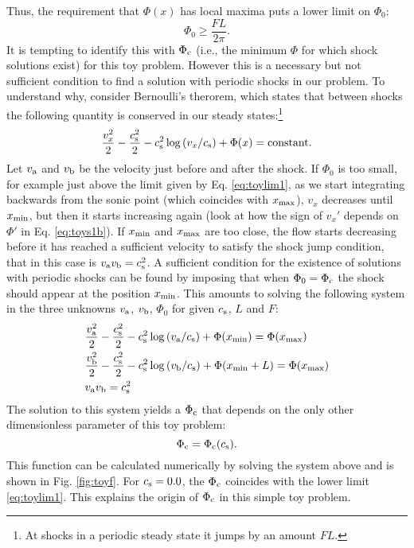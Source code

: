 \documentclass[useAMS,usenatbib]{mn2e}
\begin{document}
Thus, the requirement that $\Phi(x)$ has local maxima puts a lower limit on $\Phi_0$:
\begin{equation}
\Phi_0 \geq \frac{F L } {2 \pi}. \label{eq:toylim1}
\end{equation}
It is tempting to identify this with $\Phi_{\rm c}$ (i.e., the minimum $\Phi$ for which shock solutions exist) for this toy problem. However this is a necessary but not sufficient condition to find a solution with periodic shocks in our problem. To understand why, consider Bernoulli's therorem, which states that between shocks the following quantity is conserved in our steady states:\footnote{At shocks in a periodic steady state it jumps by an amount $FL$.}
\begin{equation}
 \frac{v_x^2}{2} - \frac{c_{\rm s}^2}{2} - c_{\rm s}^2 \log\left(v_x/c_{\rm s}\right) + \Phi(x) = \rm{constant}.
\end{equation}
%
Let $v_{\rm a}$ and $v_{\rm b}$ be the velocity just before and after the shock. If $\Phi_0$ is too small, for example just above the limit given by Eq. \eqref{eq:toylim1}, as we start integrating backwards from the sonic point (which coincides with $x_{\rm max}$), $v_x$ decreases until $x_{\rm min}$, but then it starts increasing again (look at how the sign of $v_x'$ depends on $\Phi'$ in Eq. \ref{eq:toys1b}). If $x_{\rm min}$ and $x_{\rm max}$ are too close, the flow starts decreasing before it has reached a sufficient velocity to satisfy the shock jump condition, that in this case is $v_{\rm a} v_{\rm b} = c_{\rm s}^2$. A sufficient condition for the existence of solutions with periodic shocks can be found by imposing that when $\Phi_0=\Phi_{\rm c}$ the shock should appear at the position $x_{\rm min}$. This amounts to solving the following system in the three unknowns $v_{\rm a}$, $v_{\rm b}$, $\Phi_0$ for given $c_{\rm s}$, $L$ and $F$:
\begin{align} 
	& \frac{v_{\rm a}^2}{2} - \frac{c_{\rm s}^2}{2} - c_{\rm s}^2 \log\left(v_{\rm a}/c_{\rm s}\right) + \Phi(x_{\rm min}) = \Phi(x_{\rm max}) \\ 
	&  \frac{v_{\rm b}^2}{2} - \frac{c_{\rm s}^2}{2} - c_{\rm s}^2 \log\left(v_{\rm b}/c_{\rm s}\right) + \Phi(x_{\rm min} + L) = \Phi(x_{\rm max}) \\ 
	& v_{\rm a} v_{\rm b} = c_{\rm s}^2
\end{align}
%
The solution to this system yields a $\Phi_{\rm c}$ that depends on the only other dimensionless parameter of this toy problem:
%
\begin{equation}
\Phi_{\rm c} = \Phi_{\rm c}(c_{\rm s}).
\end{equation}
%
This function can be calculated numerically by solving the system above and is shown in Fig. \ref{fig:toyf}. For $c_{\rm s}=0.0$, the $\Phi_{\rm c}$ coincides with the lower limit \eqref{eq:toylim1}. This explains the origin of $\Phi_{\rm c}$ in this simple toy problem.
\end{document}

